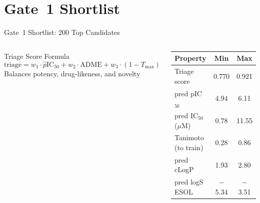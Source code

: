 \documentclass[aspectratio=169]{beamer}
\begin{document}
\section{Gate~1 Shortlist}

\begin{frame}{Gate~1 Shortlist: 200 Top Candidates}
  \begin{columns}
    \begin{block}{Triage Score Formula}
      \small
      \vspace{-0.2em}
      \[
        \text{triage} = w_1 \cdot \hat{p}\text{IC}_{50} + w_2 \cdot \text{ADME} + w_3 \cdot (1 - T_{\max})
      \]
      Balances potency, drug-likeness, and novelty
    \end{block}
    \vspace{0.4em}
    \small
    \begin{tabular}{lcc}
      \toprule
      \textbf{Property} & \textbf{Min} & \textbf{Max} \\
      \midrule
      Triage score        & 0.770 & 0.921 \\
      pred pIC$_{50}$     & 4.94  & 6.11 \\
      pred IC$_{50}$ ($\mu$M) & 0.78 & 11.55 \\
      Tanimoto (to train) & 0.28  & 0.86 \\
      pred cLogP          & 1.93  & 2.80 \\
      pred logS ESOL      & $-$5.34 & $-$3.51 \\
      \bottomrule
    \end{tabular}


\end{columns}
\end{frame}
\end{document}
